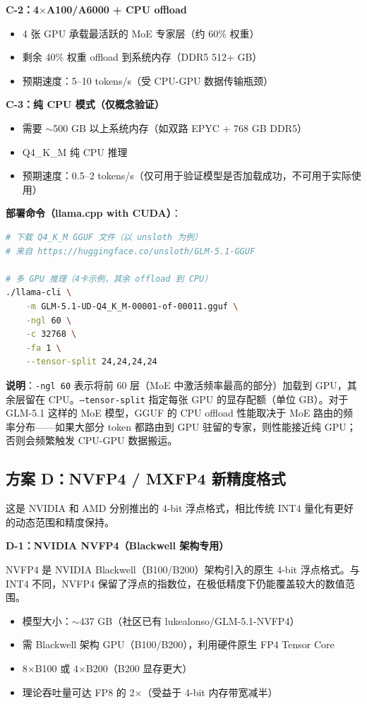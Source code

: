 \documentclass[UTF8,a4paper,10pt,oneside]{ctexart}
\begin{document}
\textbf{C-2：4$\times$A100/A6000 + CPU offload}
\begin{itemize}
    \item 4 张 GPU 承载最活跃的 MoE 专家层（约 60\% 权重）
    \item 剩余 40\% 权重 offload 到系统内存（DDR5 512+ GB）
    \item 预期速度：5--10 tokens/s（受 CPU-GPU 数据传输瓶颈）
\end{itemize}

\textbf{C-3：纯 CPU 模式（仅概念验证）}
\begin{itemize}
    \item 需要 $\sim$500 GB 以上系统内存（如双路 EPYC + 768 GB DDR5）
    \item Q4\_K\_M 纯 CPU 推理
    \item 预期速度：0.5--2 tokens/s（仅可用于验证模型是否加载成功，不可用于实际使用）
\end{itemize}

\textbf{部署命令（llama.cpp with CUDA）}：
\begin{lstlisting}[language=bash]
# 下载 Q4_K_M GGUF 文件（以 unsloth 为例）
# 来自 https://huggingface.co/unsloth/GLM-5.1-GGUF

# 多 GPU 推理（4卡示例，其余 offload 到 CPU）
./llama-cli \
    -m GLM-5.1-UD-Q4_K_M-00001-of-00011.gguf \
    -ngl 60 \
    -c 32768 \
    -fa 1 \
    --tensor-split 24,24,24,24
\end{lstlisting}

\textbf{说明}：\texttt{-ngl 60} 表示将前 60 层（MoE 中激活频率最高的部分）加载到 GPU，其余层留在 CPU。\texttt{--tensor-split} 指定每张 GPU 的显存配额（单位 GB）。对于 GLM-5.1 这样的 MoE 模型，GGUF 的 CPU offload 性能取决于 MoE 路由的频率分布——如果大部分 token 都路由到 GPU 驻留的专家，则性能接近纯 GPU；否则会频繁触发 CPU-GPU 数据搬运。

\subsection{方案 D：NVFP4 / MXFP4 新精度格式}

这是 NVIDIA 和 AMD 分别推出的 4-bit 浮点格式，相比传统 INT4 量化有更好的动态范围和精度保持。

\textbf{D-1：NVIDIA NVFP4（Blackwell 架构专用）}

NVFP4 是 NVIDIA Blackwell（B100/B200）架构引入的原生 4-bit 浮点格式。与 INT4 不同，NVFP4 保留了浮点的指数位，在极低精度下仍能覆盖较大的数值范围。
\begin{itemize}
    \item 模型大小：$\sim$437 GB（社区已有 lukealonso/GLM-5.1-NVFP4）
    \item 需 Blackwell 架构 GPU（B100/B200），利用硬件原生 FP4 Tensor Core
    \item 8$\times$B100 或 4$\times$B200（B200 显存更大）
    \item 理论吞吐量可达 FP8 的 2$\times$（受益于 4-bit 内存带宽减半）
\end{itemize}
\end{document}
